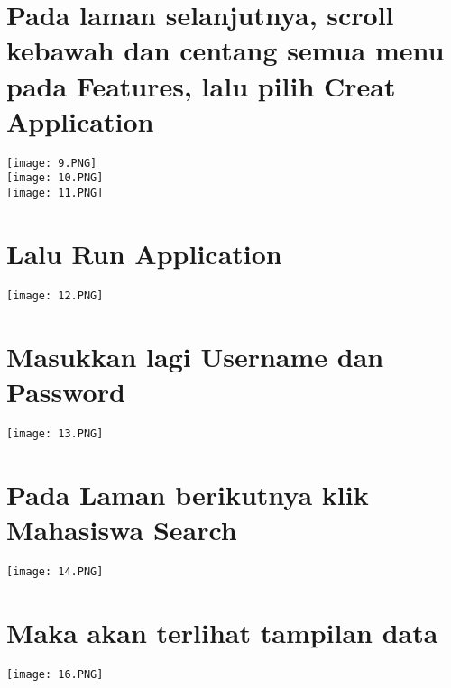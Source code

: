 \documentclass{article}
\begin{document}
\section{Pada laman selanjutnya, scroll kebawah dan centang semua menu pada Features, lalu pilih Creat Application}
\begin{center}
    \texttt{[image: 9.PNG]} \\
    \texttt{[image: 10.PNG]} \\
    \texttt{[image: 11.PNG]}
\end{center}
\section{Lalu Run Application}
\begin{center}
    \texttt{[image: 12.PNG]}
\end{center}
\section{Masukkan lagi Username dan Password}
\begin{center}
    \texttt{[image: 13.PNG]}
\end{center}
\section{Pada Laman berikutnya klik Mahasiswa Search}
\begin{center}
    \texttt{[image: 14.PNG]}
\end{center}
\section{Maka akan terlihat tampilan data }
\begin{center}
    \texttt{[image: 16.PNG]}
\end{center}
\end{document}
